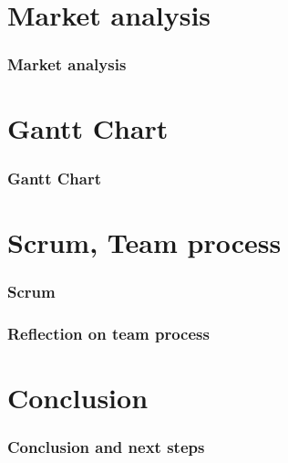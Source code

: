 \section{Market analysis}

\begin{frame}
  \frametitle{Market analysis}
\end{frame}

\section{Gantt Chart}

\begin{frame}
  \frametitle{Gantt Chart}
\end{frame}

\section{Scrum, Team process}

\begin{frame}
  \frametitle{Scrum}
\end{frame}

\begin{frame}
  \frametitle{Reflection on team process}
\end{frame}

\section{Conclusion}

\begin{frame}
  \frametitle{Conclusion and next steps}
\end{frame}


